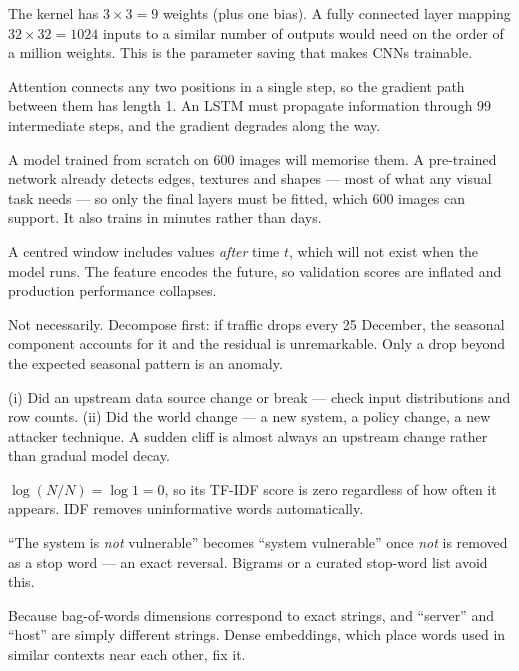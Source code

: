 \begin{ans}
  \item The kernel has $3\times3 = 9$ weights (plus one bias). A fully connected
        layer mapping $32\times32 = 1024$ inputs to a similar number of outputs would
        need on the order of a million weights. This is the parameter saving that
        makes CNNs trainable.
  \item Attention connects any two positions in a single step, so the gradient path
        between them has length 1. An LSTM must propagate information through 99
        intermediate steps, and the gradient degrades along the way.
  \item A model trained from scratch on 600 images will memorise them. A pre-trained
        network already detects edges, textures and shapes --- most of what any
        visual task needs --- so only the final layers must be fitted, which 600
        images can support. It also trains in minutes rather than days.
\end{ans}

\begin{ans}
  \item A centred window includes values \emph{after} time $t$, which will not exist
        when the model runs. The feature encodes the future, so validation scores are
        inflated and production performance collapses.
  \item Not necessarily. Decompose first: if traffic drops every 25 December, the
        seasonal component accounts for it and the residual is unremarkable. Only a
        drop beyond the expected seasonal pattern is an anomaly.
  \item (i) Did an upstream data source change or break --- check input distributions
        and row counts. (ii) Did the world change --- a new system, a policy change,
        a new attacker technique. A sudden cliff is almost always an upstream change
        rather than gradual model decay.
\end{ans}

\begin{ans}
  \item $\log(N/N) = \log 1 = 0$, so its TF-IDF score is zero regardless of how often
        it appears. IDF removes uninformative words automatically.
  \item ``The system is \emph{not} vulnerable'' becomes ``system vulnerable'' once
        \emph{not} is removed as a stop word --- an exact reversal. Bigrams or a
        curated stop-word list avoid this.
  \item Because bag-of-words dimensions correspond to exact strings, and ``server''
        and ``host'' are simply different strings. Dense embeddings, which place
        words used in similar contexts near each other, fix it.
\end{ans}

